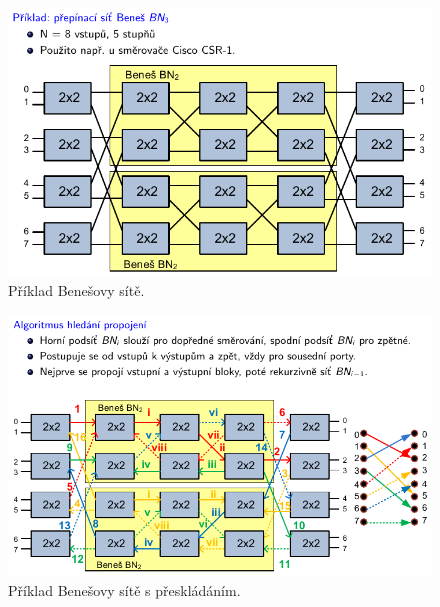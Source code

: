 \begin{figure}[H]
    \centering
    \includegraphics[width=0.9\linewidth]{benes_priklad_1.pdf}
    \caption{Příklad Benešovy sítě.}
\end{figure}

\begin{figure}[H]
    \centering
    \includegraphics[width=1\linewidth]{benes_priklad_2.pdf}
    \caption{Příklad Benešovy sítě s přeskládáním.}
\end{figure}
